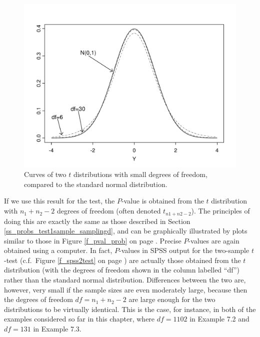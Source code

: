 \begin{figure}
\caption{
Curves of two $t$ distributions with small degrees of freedom, compared
to the standard normal distribution.
}
\label{f_tdistr1}
\begin{center}

\includegraphics[width=13cm]{tdistr1}
\end{center}

\end{figure}

If we use this result for the test, the
$P$-value is obtained from the $t$ distribution with $n_{1}+n_{2}-2$
degrees of freedom (often denoted $t_{n1+n2-2}$).
The principles of doing this are exactly the
same as those described in Section
\ref{ss_probs_test1sample_samplingd}, and
can be graphically illustrated by plots similar to those in Figure
\ref{f_pval_prob} on page
\pageref{f_pval_prob}.
Precise $P$-values are again
obtained using a computer. In fact, $P$-values in SPSS output for the
two-sample $t$-test (c.f.\ Figure \ref{f_spss2test} on page
\pageref{f_spss2test}) are actually those obtained from the $t$
distribution (with the degrees of freedom shown in the column labelled
``df'') rather than the standard normal distribution.
Differences between the two are, however, very small if the sample sizes are even
moderately large, because then the degrees of freedom $df=n_{1}+n_{2}-2$
are large enough for the two distributions to be virtually identical.
This is the case, for instance, in both
of the examples considered so far in this chapter, where $df=1102$ in
Example 7.2 and $df=131$ in Example 7.3.

